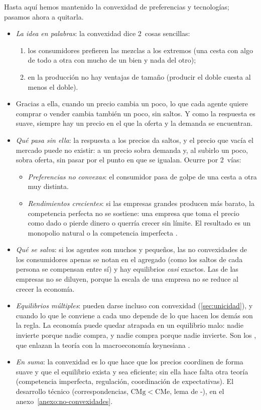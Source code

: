 \documentclass[11pt]{article}
\begin{document}
Hasta aquí hemos mantenido la convexidad de preferencias y tecnologías; pasamos ahora a quitarla.

\begin{itemize}
\item \emph{La idea en palabras}: la convexidad dice 2~cosas sencillas:
  \begin{enumerate}
  \item los consumidores prefieren las mezclas a los extremos (una cesta con algo de todo a otra con mucho de un bien y nada del otro);
  \item en la producción no hay ventajas de tamaño (producir el doble cuesta al menos el doble).
  \end{enumerate}
\item Gracias a ella, cuando un precio cambia un poco, lo que cada agente quiere comprar o vender cambia también un poco, sin saltos. Y como la respuesta es suave, siempre hay un precio en el que la oferta y la demanda se encuentran.
\item \emph{Qué pasa sin ella}: la respuesta a los precios da saltos, y el precio que vacía el mercado puede no existir: a un precio sobra demanda y, al subirlo un poco, sobra oferta, sin pasar por el punto en que se igualan. Ocurre por 2~vías:
  \begin{itemize}
  \item \emph{Preferencias no convexas}: el consumidor pasa de golpe de una cesta a otra muy distinta.
  \item \emph{Rendimientos crecientes}: si las empresas grandes producen más barato, la competencia perfecta no se sostiene: una empresa que toma el precio como dado o pierde dinero o querría crecer sin límite. El resultado es un monopolio natural  o la competencia imperfecta .
  \end{itemize}
\item \emph{Qué se salva}: si los agentes son muchos y pequeños, las no convexidades de los consumidores apenas se notan en el agregado (como los saltos de cada persona se compensan entre sí) y hay equilibrios \emph{casi} exactos\nocite{Starr1969Quasi}. Las de las empresas no se diluyen, porque la escala de una empresa no se reduce al crecer la economía.
\item \emph{Equilibrios múltiples}: pueden darse incluso con convexidad (\ref{sec:unicidad}), y cuando lo que le conviene a cada uno depende de lo que hacen los demás son la regla. La economía puede quedar atrapada en un equilibrio malo: nadie invierte porque nadie compra, y nadie compra porque nadie invierte. Son los , que enlazan la teoría con la macroeconomía keynesiana\nocite{CooperJohn1988Coordinating} .
\item \emph{En suma}: la convexidad es lo que hace que los precios coordinen de forma suave y que el equilibrio exista y sea eficiente; sin ella hace falta otra teoría (competencia imperfecta, regulación, coordinación de expectativas). El desarrollo técnico (correspondencias, $\mathrm{CMg}<\mathrm{CMe}$, lema de -), en el anexo~\ref{anexo:no-convexidades}.
\end{itemize}
\end{document}

